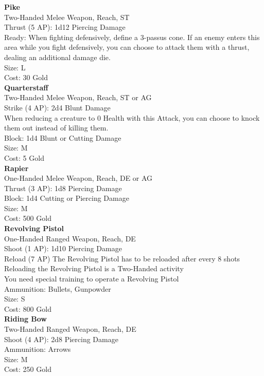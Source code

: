 \textbf{Pike}\\
Two-Handed Melee Weapon,  Reach, ST\\
Thrust (5 AP): 1d12 Piercing Damage\\
Ready: When fighting defensively, define a 3-passus cone. If an enemy enters this area while you fight defensively, you can choose to attack them with a thrust, dealing an additional damage die.\\
Size: L\\
Cost: 30 Gold\\


\textbf{Quarterstaff}\\
Two-Handed Melee Weapon,  Reach, ST or AG\\
Strike (4 AP): 2d4 Blunt Damage\\
When reducing a creature to 0 Health with this Attack, you can choose to knock them out instead of killing them.\\
Block: 1d4 Blunt or Cutting Damage\\
Size: M\\
Cost: 5 Gold\\


\textbf{Rapier}\\
One-Handed Melee Weapon,  Reach, DE or AG\\
Thrust (3 AP): 1d8 Piercing Damage\\
Block: 1d4 Cutting or Piercing Damage\\
Size: M\\
Cost: 500 Gold\\


\textbf{Revolving Pistol}\\
One-Handed Ranged Weapon,  Reach, DE\\
Shoot (1 AP): 1d10 Piercing Damage\\
Reload (7 AP) The Revolving Pistol has to be reloaded after every 8 shots\\
Reloading the Revolving Pistol is a Two-Handed activity\\
You need special training to operate a Revolving Pistol\\
Ammunition: Bullets, Gunpowder\\
Size: S\\
Cost: 800 Gold\\


\textbf{Riding Bow}\\
Two-Handed Ranged Weapon,  Reach, DE\\
Shoot (4 AP): 2d8 Piercing Damage\\
Ammunition: Arrows\\
Size: M\\
Cost: 250 Gold\\


